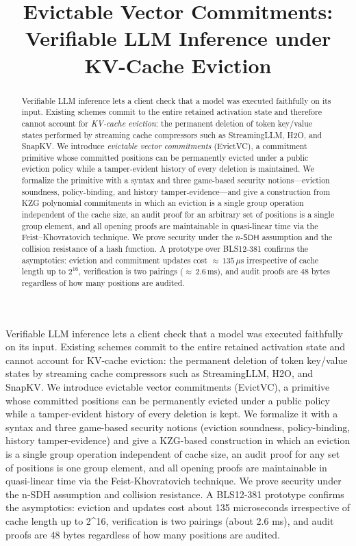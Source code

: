 \documentclass[version=submission]{iacrcc}
\title[running = {Evictable Vector Commitments}]{Evictable Vector Commitments: Verifiable LLM Inference under KV-Cache Eviction}
\theoremstyle{definition}
\newcommand{\nsdh}{n\text{-}\mathsf{SDH}}
\begin{document}
\maketitle


\begin{abstract}
Verifiable LLM inference lets a client check that a model was executed
faithfully on its input. Existing schemes commit to the entire retained
activation state and therefore cannot account for \emph{KV-cache eviction}:
the permanent deletion of token key/value states performed by streaming cache
compressors such as StreamingLLM, H2O, and SnapKV. We introduce
\emph{evictable vector commitments} (EvictVC), a commitment primitive whose
committed positions can be permanently evicted under a public eviction policy
while a tamper-evident history of every deletion is maintained. We formalize
the primitive with a syntax and three game-based security notions---eviction
soundness, policy-binding, and history tamper-evidence---and give a
construction from KZG polynomial commitments in which an eviction is a single
group operation independent of the cache size, an audit proof for an arbitrary
set of positions is a single group element, and all opening proofs are
maintainable in quasi-linear time via the Feist--Khovratovich technique. We
prove security under the $\nsdh$ assumption and the collision resistance of a
hash function. A prototype over BLS12-381 confirms the asymptotics: eviction and
commitment updates cost ${\approx}\,135\,\mu\mathrm{s}$ irrespective of cache
length up to $2^{16}$, verification is two pairings
(${\approx}\,2.6\,\mathrm{ms}$), and audit proofs are $48$ bytes regardless of
how many positions are audited.
\end{abstract}

\begin{textabstract}
Verifiable LLM inference lets a client check that a model was executed faithfully on its input. Existing schemes commit to the entire retained activation state and cannot account for KV-cache eviction: the permanent deletion of token key/value states by streaming cache compressors such as StreamingLLM, H2O, and SnapKV. We introduce evictable vector commitments (EvictVC), a primitive whose committed positions can be permanently evicted under a public policy while a tamper-evident history of every deletion is kept. We formalize it with a syntax and three game-based security notions (eviction soundness, policy-binding, history tamper-evidence) and give a KZG-based construction in which an eviction is a single group operation independent of cache size, an audit proof for any set of positions is one group element, and all opening proofs are maintainable in quasi-linear time via the Feist-Khovratovich technique. We prove security under the n-SDH assumption and collision resistance. A BLS12-381 prototype confirms the asymptotics: eviction and updates cost about 135 microseconds irrespective of cache length up to 2^16, verification is two pairings (about 2.6 ms), and audit proofs are 48 bytes regardless of how many positions are audited.
\end{textabstract}
\end{document}
